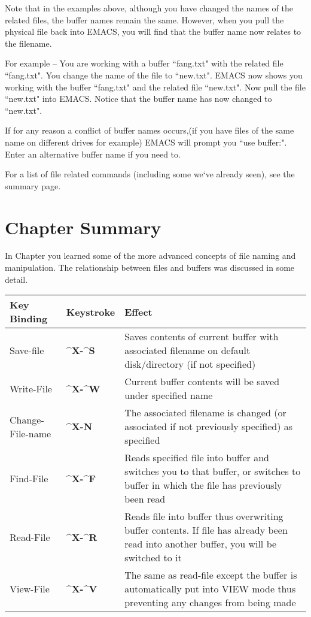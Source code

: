 Note that in the examples above, although you have changed the names of
the related files, the buffer names remain the same.  However, when you
pull the physical file back into EMACS, you will find that the buffer
name now relates to the filename.

For example -- You are working with a buffer ``fang.txt" with the related
file ``fang.txt".  You change the name of the file to ``new.txt".  EMACS
now shows you working with the buffer ``fang.txt" and the related file
``new.txt".  Now pull the file ``new.txt" into EMACS.  Notice that the
buffer name has now changed to ``new.txt".

If for any reason a conflict of buffer names occurs,(if you have files
of the same name on different drives for example) EMACS will prompt
you ``use buffer:".  Enter an alternative buffer name if you need to.

For a list of file related commands (including some we`ve already
seen), see the summary page.
\section{Chapter \thechapter{} Summary}

In Chapter \thechapter{} you learned some of the more advanced
concepts of file naming and manipulation.  The relationship between
files and buffers was discussed in some detail.

\begin{tabular}{llp{4in}}
Key Binding & Keystroke & Effect \\ \hline
Save-file & {\bf{}\^{}X-\^{}S} & Saves contents of current buffer with
associated filename on default disk/directory (if not specified) \\
Write-File & {\bf{}\^{}X-\^{}W} & Current buffer contents will be
saved under specified name \\
Change-File-name
 & {\bf{}\^{}X-N} & The associated filename is changed
(or associated if not previously
specified) as specified \\
Find-File & {\bf{}\^{}X-\^{}F} & Reads specified file into buffer and
switches you to that buffer, or switches
to buffer in which the file has previously
been read \\
Read-File & {\bf{}\^{}X-\^{}R} & Reads file into buffer thus overwriting
buffer contents.  If file has already
been read into another buffer, you will
be switched to it \\
View-File & {\bf{}\^{}X-\^{}V} & The same as read-file except the buffer
is automatically put into VIEW mode thus
preventing any changes from being made \\
\end{tabular}

